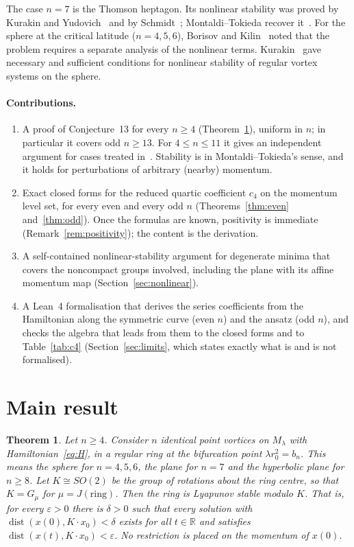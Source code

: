 \documentclass[11pt]{article}
\newtheorem{theorem}{Theorem}
\theoremstyle{definition}
\theoremstyle{remark}
\newcommand{\R}{\mathbb{R}}
\begin{document}
The case $n=7$ is the Thomson heptagon. Its nonlinear stability was proved by Kurakin and
Yudovich~\cite{KY} and by Schmidt~\cite{Schmidt}; Montaldi--Tokieda recover it~\cite[Cor.~7]{MT}. For the
sphere at the critical latitude ($n=4,5,6$), Borisov and Kilin~\cite{BK} noted that the problem requires a
separate analysis of the nonlinear terms. Kurakin~\cite{Kurakin03,Kurakin04} gave necessary and sufficient
conditions for nonlinear stability of regular vortex systems on the sphere.

\paragraph{Contributions.}
\begin{enumerate}
\item A proof of Conjecture~13 for every $n\ge4$ (Theorem~\ref{thm:main}), uniform in $n$; in particular
it covers odd $n\ge13$. For $4\le n\le11$ it gives an independent argument for cases treated
in~\cite{MT}. Stability is in Montaldi--Tokieda's sense, and it holds for perturbations of arbitrary
(nearby) momentum.
\item Exact closed forms for the reduced quartic coefficient $c_4$ on the momentum level set, for every
even and every odd $n$ (Theorems~\ref{thm:even} and~\ref{thm:odd}). Once the formulas are known,
positivity is immediate (Remark~\ref{rem:positivity}); the content is the derivation.
\item A self-contained nonlinear-stability argument for degenerate minima that covers the noncompact groups
involved, including the plane with its affine momentum map (Section~\ref{sec:nonlinear}).
\item A Lean~4 formalisation that derives the series coefficients from the Hamiltonian along the symmetric
curve (even $n$) and the ansatz (odd $n$), and checks the algebra that leads from them to the closed forms
and to Table~\ref{tab:c4} (Section~\ref{sec:limits}, which states exactly what is and is not formalised).
\end{enumerate}

\section{Main result}\label{sec:main}

\begin{theorem}\label{thm:main}
Let $n\ge4$. Consider $n$ identical point vortices on $M_\lambda$ with Hamiltonian~\eqref{eq:H}, in a
regular ring at the bifurcation point $\lambda r_0^2=b_n$. This means the sphere for $n=4,5,6$, the plane
for $n=7$ and the hyperbolic plane for $n\ge8$. Let $K\cong SO(2)$ be the group of rotations about the ring
centre, so that $K=G_\mu$ for $\mu=J(\text{ring})$. Then the ring is Lyapunov stable modulo $K$. That is,
for every $\varepsilon>0$ there is $\delta>0$ such that every solution with
$\operatorname{dist}(x(0),K\cdot x_0)<\delta$ exists for all $t\in\R$ and satisfies
$\operatorname{dist}(x(t),K\cdot x_0)<\varepsilon$. No restriction is placed on the momentum of $x(0)$.
\end{theorem}
\end{document}
